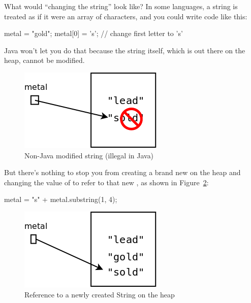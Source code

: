 What would ``changing the string'' look like? In some languages, a string is treated as if it were an array of characters, and you could write code like this:

\begin{code}
metal = "gold";
metal[0] = 's'; // change first letter to 's'
\end{code}

Java won't let you do that because the string itself, which is out there on the heap, cannot be modified.

\begin{figure}[!h]
\begin{center}
\includegraphics[scale=0.4]{figs/bad_heap.png}
\caption{Non-Java modified string (illegal in Java)}
\label{fig.bad.heap}
\end{center}
\end{figure}

But there's nothing to stop you from creating a brand new  on the heap and changing the value of  to refer to that new , as shown in Figure~\ref{fig.heap3}:

\begin{code}
metal = "s" + metal.substring(1, 4);
\end{code}

\begin{figure}[!h]
\begin{center}
\includegraphics[scale=0.4]{figs/heap3.png}
\caption{Reference to a newly created String on the heap}
\label{fig.heap3}
\end{center}
\end{figure}

\clearpage

